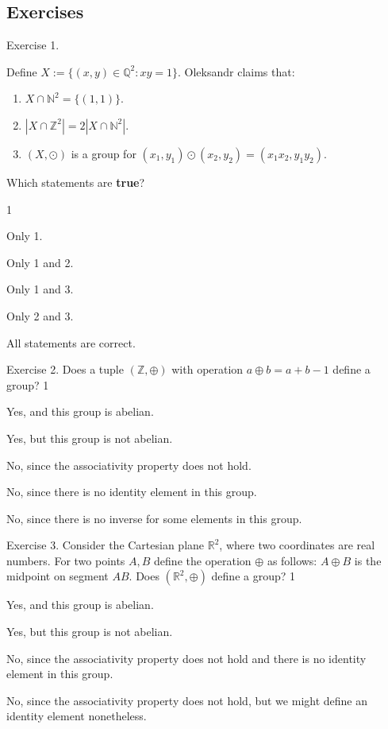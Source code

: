 \documentclass[../lecture-notes-148x210.tex]{subfiles}
\begin{document}
\newpage

\subsection{Exercises}

\begin{xexercise}
    {Exercise 1.}
    {Define $X := \{(x,y) \in \mathbb{Q}^2: xy=1\}$. Oleksandr claims that:
    \begin{enumerate}
        \item $X \cap \mathbb{N}^2 = \{(1,1)\}$.
        \item $|X \cap \mathbb{Z}^2| = 2|X \cap \mathbb{N}^2|$.
        \item $(X,\odot)$ is a group for $(x_1,y_1)\odot (x_2,y_2) = (x_1x_2,y_1y_2)$.
    \end{enumerate}
    Which statements are \textbf{true}?
    }
    {1}
    {
        \item Only 1.
        \item Only 1 and 2.
        \item Only 1 and 3.
        \item Only 2 and 3.
        \item All statements are correct.
    }
\end{xexercise}

\begin{xexercise}
    {Exercise 2.}
    {Does a tuple $(\mathbb{Z},\oplus)$ with operation $a \oplus b = a + b - 1$ define a group?}
    {1}
    {
        \item Yes, and this group is abelian.
        \item Yes, but this group is not abelian.
        \item No, since the associativity property does not hold.
        \item No, since there is no identity element in this group.
        \item No, since there is no inverse for some elements in this group.
    }
\end{xexercise}

\begin{xexercise}
    {Exercise 3.}
    {Consider the Cartesian plane $\mathbb{R}^2$, where two coordinates are real numbers. For two points $A,B$ 
    define the operation $\oplus$ as follows: $A \oplus B$ is the midpoint on segment $AB$. Does 
    $(\mathbb{R}^2, \oplus)$ define a group?}
    {1}
    {
        \item Yes, and this group is abelian.
        \item Yes, but this group is not abelian.
        \item No, since the associativity property does not hold and there is no identity element in this group.
        \item No, since the associativity property does not hold, but we might define an identity element nonetheless.
    }
\end{xexercise}
\end{document}
